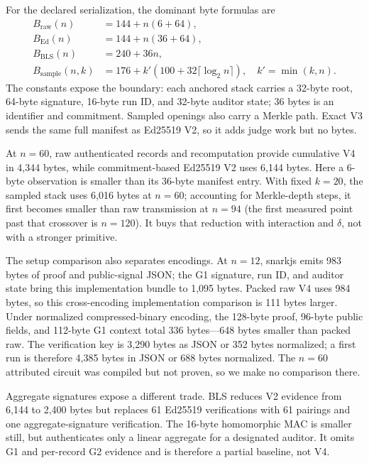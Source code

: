 For the declared serialization, the dominant byte formulas are
\begin{align*}
B_{\mathrm{raw}}(n) &= 144+n(6+64),\\
B_{\mathrm{Ed}}(n) &= 144+n(36+64),\\
B_{\mathrm{BLS}}(n) &= 240+36n,\\
B_{\mathrm{sample}}(n,k) &= 176+k'(100+32\lceil\log_2 n\rceil),
\quad k'=\min(k,n).
\end{align*}
The constants expose the boundary: each anchored stack carries a 32-byte root,
64-byte signature, 16-byte run ID, and 32-byte auditor state; 36 bytes is an
identifier and commitment. Sampled openings also carry a Merkle path. Exact V3 sends the
same full manifest as Ed25519 V2, so it adds judge work but no bytes.

At $n=60$, raw authenticated records and recomputation provide cumulative V4 in
4,344 bytes, while commitment-based Ed25519 V2 uses 6,144 bytes. Here a 6-byte
observation is smaller than its 36-byte manifest entry. With fixed $k=20$, the
sampled stack uses 6,016 bytes at $n=60$; accounting for Merkle-depth steps, it
first becomes smaller than raw transmission at $n=94$ (the first measured point
past that crossover is $n=120$). It buys that reduction with interaction and
$\delta$, not with a stronger primitive.



The setup comparison also separates encodings. At $n=12$, snarkjs emits 983
bytes of proof and public-signal JSON; the G1 signature, run ID, and auditor
state bring this implementation bundle to 1,095 bytes. Packed raw V4 uses 984
bytes, so this cross-encoding implementation comparison is 111 bytes larger.
Under normalized compressed-binary encoding, the 128-byte proof, 96-byte public fields,
and 112-byte G1 context total 336 bytes---648 bytes smaller than packed raw.
The verification key is 3,290 bytes as JSON or 352 bytes normalized; a first run is
therefore 4,385 bytes in JSON or 688 bytes normalized. The $n=60$ attributed
circuit was compiled but not proven, so we make no comparison there.

Aggregate signatures expose a different trade. BLS reduces V2 evidence from
6,144 to 2,400 bytes but replaces 61 Ed25519 verifications with 61 pairings and
one aggregate-signature verification. The 16-byte homomorphic MAC is smaller
still, but authenticates only a linear aggregate for a designated auditor. It
omits G1 and per-record G2 evidence and is therefore a partial baseline, not V4.

